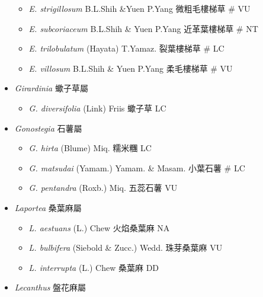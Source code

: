 \begin{itemize}
\begin{itemize}
        \item[] \textit{E. strigillosum} B.L.Shih \&Yuen P.Yang  微粗毛樓梯草  \# VU
        \item[] \textit{E. subcoriaceum} B.L.Shih \& Yuen P.Yang  近革葉樓梯草  \# NT
        \item[] \textit{E. trilobulatum} (Hayata) T.Yamaz.  裂葉樓梯草  \# LC
        \item[] \textit{E. villosum} B.L.Shih \& Yuen P.Yang  柔毛樓梯草  \# VU
  \end{itemize}
 \item[] \textit{Girardinia} 蠍子草屬
                                
  \begin{itemize}
        \item[] \textit{G. diversifolia} (Link) Friis  蠍子草   LC
  \end{itemize}
 \item[] \textit{Gonostegia} 石薯屬
                                
  \begin{itemize}
        \item[] \textit{G. hirta} (Blume) Miq.  糯米糰   LC
        \item[] \textit{G. matsudai} (Yamam.) Yamam. \& Masam.  小葉石薯  \# LC
        \item[] \textit{G. pentandra} (Roxb.) Miq.  五蕊石薯   VU
  \end{itemize}
 \item[] \textit{Laportea} 桑葉麻屬
                                
  \begin{itemize}
        \item[] \textit{L. aestuans} (L.) Chew  火焰桑葉麻   NA
        \item[] \textit{L. bulbifera} (Siebold \& Zucc.) Wedd.  珠芽桑葉麻   VU
        \item[] \textit{L. interrupta} (L.) Chew  桑葉麻   DD
  \end{itemize}
 \item[] \textit{Lecanthus} 盤花麻屬
                                

\end{itemize}
